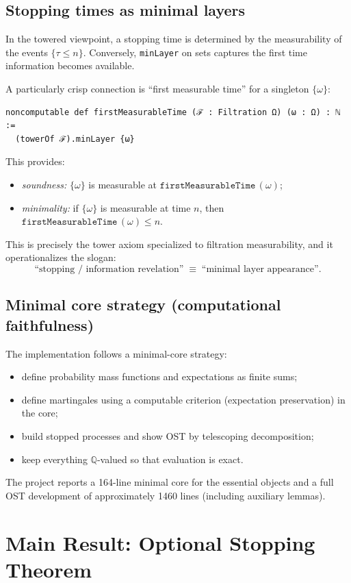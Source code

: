 \documentclass[11pt]{article}
\newcommand{\QQ}{\mathbb{Q}}
\begin{document}
\subsection{Stopping times as minimal layers}
In the towered viewpoint, a stopping time is determined by the measurability of the events $\{\tau \le n\}$. Conversely, \texttt{minLayer} on sets captures the first time information becomes available.

A particularly crisp connection is ``first measurable time'' for a singleton $\{\omega\}$:
\begin{lstlisting}
noncomputable def firstMeasurableTime (ℱ : Filtration Ω) (ω : Ω) : ℕ :=
  (towerOf ℱ).minLayer {ω}
\end{lstlisting}
This provides:
\begin{itemize}[leftmargin=1.2em]
\item \emph{soundness:} $\{\omega\}$ is measurable at $\texttt{firstMeasurableTime}\,(\omega)$;
\item \emph{minimality:} if $\{\omega\}$ is measurable at time $n$, then $\texttt{firstMeasurableTime}\,(\omega)\le n$.
\end{itemize}

This is precisely the tower axiom specialized to filtration measurability, and it operationalizes the slogan:
\[
\text{``stopping / information revelation''} \;\equiv\; \text{``minimal layer appearance''}.
\]

\subsection{Minimal core strategy (computational faithfulness)}
The implementation follows a minimal-core strategy:
\begin{itemize}[leftmargin=1.2em]
\item define probability mass functions and expectations as finite sums;
\item define martingales using a computable criterion (expectation preservation) in the core;
\item build stopped processes and show OST by telescoping decomposition;
\item keep everything $\QQ$-valued so that evaluation is exact.
\end{itemize}

The project reports a 164-line minimal core for the essential objects and a full OST development of approximately 1460 lines (including auxiliary lemmas).

\section{Main Result: Optional Stopping Theorem}
\end{document}
